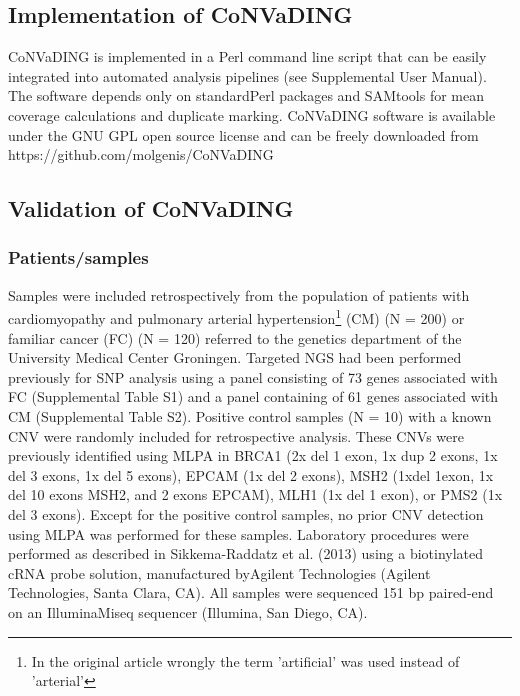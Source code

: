\subsection{Implementation of CoNVaDING}
CoNVaDING is implemented in a Perl command line script that can be easily integrated into automated analysis pipelines (see Supplemental User Manual).
The software depends only on standardPerl packages and SAMtools \cite{Li_2009} for mean coverage calculations and duplicate marking. 
CoNVaDING software is available under the GNU GPL open source license and can be freely downloaded from \\
https://github.com/molgenis/CoNVaDING

\subsection{Validation of CoNVaDING}

\subsubsection{Patients/samples}
Samples were included retrospectively from the population of patients with cardiomyopathy and pulmonary arterial hypertension\footnote{In the original article wrongly the term 'artificial' was used instead of 'arterial'} (CM) (N = 200) or familiar cancer (FC) (N = 120) referred to the genetics department of the University Medical Center Groningen. 
Targeted NGS had been performed previously for SNP analysis using a panel consisting of 73 genes associated with FC (Supplemental Table S1) and a panel containing of 61 genes associated with CM (Supplemental Table S2). 
Positive control samples (N = 10) with a known CNV were randomly included for retrospective analysis. These CNVs were previously identified using MLPA in BRCA1 (2x del 1 exon, 1x dup 2 exons, 1x del 3 exons, 1x del 5 exons), EPCAM (1x del 2 exons), MSH2 (1xdel 1exon, 1x del 10 exons MSH2, and 2 exons EPCAM), MLH1 (1x del 1 exon), or PMS2 (1x del 3 exons). 
Except for the positive control samples, no prior CNV detection using MLPA was performed for these samples. 
Laboratory procedures were performed as described in Sikkema-Raddatz et al. (2013) \cite{Sikkema_Raddatz_2013} using a biotinylated cRNA probe solution, manufactured byAgilent Technologies (Agilent Technologies, Santa Clara, CA). 
All samples were sequenced 151 bp paired-end on an IlluminaMiseq sequencer (Illumina, San Diego, CA).

